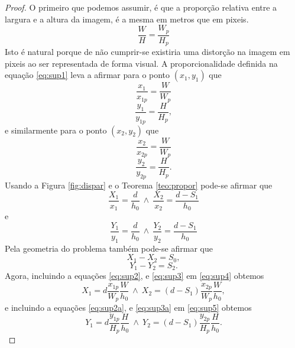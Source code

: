 \documentclass[a4paper,10pt]{article}
\begin{document}
\begin{proof}
O primeiro que podemos assumir, é que a proporção relativa entre a largura e a altura da imagem,
é a mesma em metros que em pixeis.
\begin{equation}\label{eq:sup1}
\frac{W}{H}=\frac{W_p}{H_p}
\end{equation}
Isto é natural porque de não cumprir-se existiria uma distorção na imagem em pixeis ao ser representada de forma visual.
A proporcionalidade definida na equação \eqref{eq:sup1} leva a afirmar para o ponto $(x_{1},y_{1})$ que
\begin{equation}\label{eq:sup2}
\frac{x_1}{x_{1p}}=\frac{W}{W_p}
\end{equation}
\begin{equation}\label{eq:sup2a}
\frac{y_1}{y_{1p}}=\frac{H}{H_p},
\end{equation}
e similarmente para o ponto $(x_{2},y_{2})$ que
\begin{equation}\label{eq:sup3}
\frac{x_2}{x_{2p}}=\frac{W}{W_p}
\end{equation}
\begin{equation}\label{eq:sup3a}
\frac{y_2}{y_{2p}}=\frac{H}{H_p}.
\end{equation}
Usando a Figura \ref{fig:dispar} e o Teorema \ref{teo:propor}
pode-se afirmar que 
\begin{equation}\label{eq:sup4}
\frac{X_1}{x_{1}}=\frac{d}{h_0}~\wedge~\frac{X_2}{x_{2}}=\frac{d-S_1}{h_0}
\end{equation}
e
\begin{equation}\label{eq:sup5}
\frac{Y_1}{y_{1}}=\frac{d}{h_0}~\wedge~\frac{Y_2}{y_{2}}=\frac{d-S_1}{h_0}
\end{equation}
Pela geometria do problema também pode-se afirmar que 
\begin{equation}\label{eq:sup6}
X_1-X_2=S_0,
\end{equation}
\begin{equation}\label{eq:sup7}
Y_1-Y_2=S_2.
\end{equation}
Agora, incluindo a equações \eqref{eq:sup2}, e \eqref{eq:sup3} em \eqref{eq:sup4}
obtemos
\begin{equation}\label{eq:sup4a}
X_1=d\frac{x_{1p}}{W_p}\frac{W}{h_0}~\wedge~X_2=(d-S_1)\frac{x_{2p}}{W_p}\frac{W}{h_0},
\end{equation}
e incluindo a equações \eqref{eq:sup2a}, e \eqref{eq:sup3a} em \eqref{eq:sup5}
obtemos
\begin{equation}\label{eq:sup5a}
Y_1=d\frac{y_{1p}}{H_p}\frac{H}{h_0}~\wedge~Y_2=(d-S_1)\frac{y_{2p}}{H_p}\frac{H}{h_0}.
\end{equation}


\end{proof}
\end{document}
